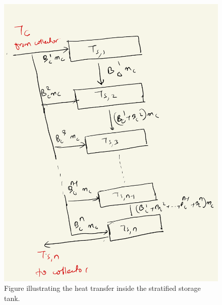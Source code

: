 \documentclass{article}
\begin{document}
\begin{figure}[ht]
\centering
\includegraphics[scale = 0.5]{Diagram.pdf}
\caption{Figure illustrating the heat transfer inside the stratified storage tank.}
\label{fig: heat_tank}
\end{figure}
\end{document}

